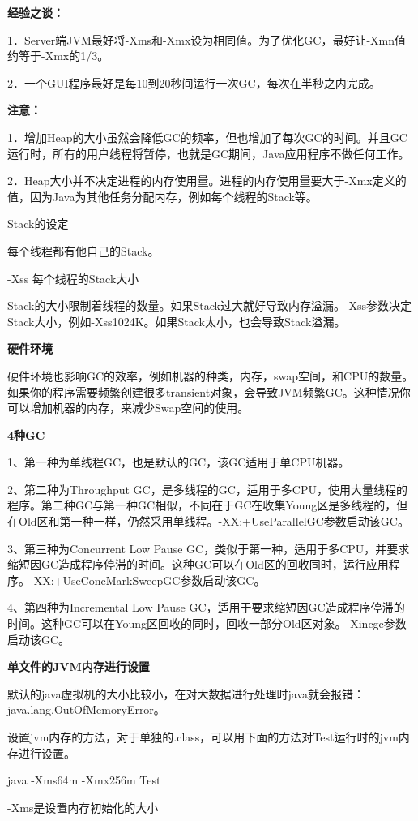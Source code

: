 \documentclass[10pt,b5paper]{article}
\begin{document}
\textbf{经验之谈：}

1．Server端JVM最好将-Xms和-Xmx设为相同值。为了优化GC，最好让-Xmn值约等于-Xmx的1/3。

2．一个GUI程序最好是每10到20秒间运行一次GC，每次在半秒之内完成。

\textbf{注意：}

1．增加Heap的大小虽然会降低GC的频率，但也增加了每次GC的时间。并且GC运行时，所有的用户线程将暂停，也就是GC期间，Java应用程序不做任何工作。

2．Heap大小并不决定进程的内存使用量。进程的内存使用量要大于-Xmx定义的值，因为Java为其他任务分配内存，例如每个线程的Stack等。

Stack的设定

每个线程都有他自己的Stack。

-Xss 每个线程的Stack大小

Stack的大小限制着线程的数量。如果Stack过大就好导致内存溢漏。-Xss参数决定Stack大小，例如-Xss1024K。如果Stack太小，也会导致Stack溢漏。

\textbf{硬件环境}

硬件环境也影响GC的效率，例如机器的种类，内存，swap空间，和CPU的数量。
如果你的程序需要频繁创建很多transient对象，会导致JVM频繁GC。这种情况你可以增加机器的内存，来减少Swap空间的使用。

\textbf{4种GC}

1、第一种为单线程GC，也是默认的GC，该GC适用于单CPU机器。

2、第二种为Throughput GC，是多线程的GC，适用于多CPU，使用大量线程的程序。第二种GC与第一种GC相似，不同在于GC在收集Young区是多线程的，但在Old区和第一种一样，仍然采用单线程。-XX:+UseParallelGC参数启动该GC。

3、第三种为Concurrent Low Pause GC，类似于第一种，适用于多CPU，并要求缩短因GC造成程序停滞的时间。这种GC可以在Old区的回收同时，运行应用程序。-XX:+UseConcMarkSweepGC参数启动该GC。

4、第四种为Incremental Low Pause GC，适用于要求缩短因GC造成程序停滞的时间。这种GC可以在Young区回收的同时，回收一部分Old区对象。-Xincgc参数启动该GC。

\textbf{单文件的JVM内存进行设置}

默认的java虚拟机的大小比较小，在对大数据进行处理时java就会报错：java.lang.OutOfMemoryError。

设置jvm内存的方法，对于单独的.class，可以用下面的方法对Test运行时的jvm内存进行设置。

java -Xms64m -Xmx256m Test

-Xms是设置内存初始化的大小
\end{document}
